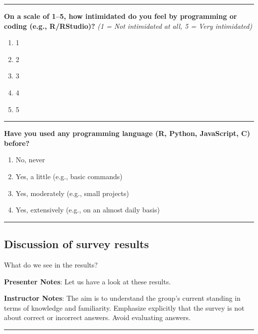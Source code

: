 \documentclass[
  letterpaper,
  DIV=11,
  numbers=noendperiod]{scrartcl}
\begin{document}
\begin{center}\rule{0.5\linewidth}{0.5pt}\end{center}

\textbf{On a scale of 1--5, how intimidated do you feel by programming
or coding (e.g., R/RStudio)?} \emph{(1 = Not intimidated at all, 5 =
Very intimidated)}

\begin{enumerate}
\def\labelenumi{\alph{enumi}.}
\item
  1
\item
  2
\item
  3
\item
  4
\item
  5
\end{enumerate}

\begin{center}\rule{0.5\linewidth}{0.5pt}\end{center}

\textbf{Have you used any programming language (R, Python, JavaScript,
C) before?}

\begin{enumerate}
\def\labelenumi{\alph{enumi}.}
\item
  No, never
\item
  Yes, a little (e.g., basic commands)
\item
  Yes, moderately (e.g., small projects)
\item
  Yes, extensively (e.g., on an almost daily basis)
\end{enumerate}

\begin{center}\rule{0.5\linewidth}{0.5pt}\end{center}

\subsection{Discussion of survey
results}\label{discussion-of-survey-results}

What do we see in the results?

\textbf{Presenter Notes}: Let us have a look at these results.

\textbf{Instructor Notes}: The aim is to understand the group's current
standing in terms of knowledge and familiarity. Emphasize explicitly
that the survey is not about correct or incorrect answers. Avoid
evaluating answers.

\begin{center}\rule{0.5\linewidth}{0.5pt}\end{center}
\end{document}
